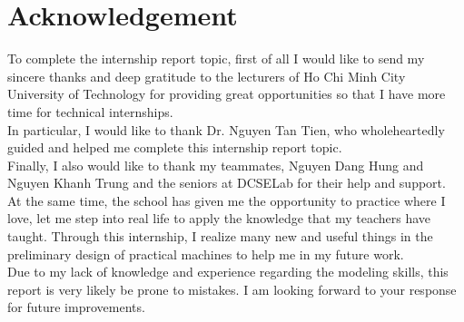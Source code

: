 \documentclass{presets}
\begin{document}
	\chapter*{Acknowledgement}
	To complete the internship report topic, first of all I would like to send my sincere thanks and deep gratitude to the lecturers of Ho Chi Minh City University of Technology for providing great opportunities so that I have more time for technical internships.\\
	In particular, I would like to thank Dr. Nguyen Tan Tien, who wholeheartedly guided and helped me complete this internship report topic.\\
	Finally, I also would like to thank my teammates, Nguyen Dang Hung and Nguyen Khanh Trung and the seniors at DCSELab for their help and support.\\
	At the same time, the school has given me the opportunity to practice where I love, let me step into real life to apply the knowledge that my teachers have taught. Through this internship, I realize many new and useful things in the preliminary design of practical machines to help me in my future work.\\
	Due to my lack of knowledge and experience regarding the modeling skills, this report is very likely be prone to mistakes. I am looking forward to your response for future improvements.
	
	
	
	
	
	
	
\end{document}

